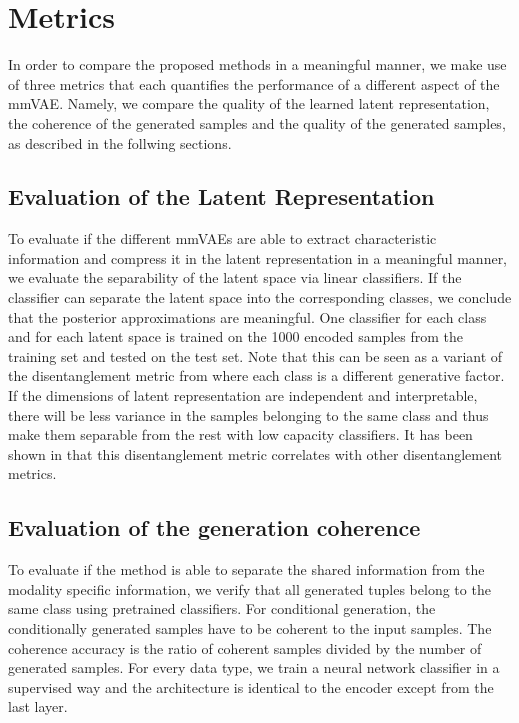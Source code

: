 \section{Metrics}
In order to compare the proposed methods in a meaningful manner, we make use of three metrics that each quantifies the performance of a different aspect of the mmVAE.
Namely, we compare the quality of the learned latent representation, the coherence of the generated samples and the quality of the generated samples, as described in the follwing sections.

\subsection{Evaluation of the Latent Representation}
To evaluate if the different mmVAEs are able to extract characteristic information and compress it in the latent representation in a meaningful manner, we evaluate the separability of the latent space via linear classifiers.
If the classifier can separate the latent space into the corresponding classes, we conclude that the posterior approximations are meaningful.
One classifier for each class and for each latent space is trained on the 1000 encoded samples from the training set and tested on the test set.
Note that this can be seen as a variant of the disentanglement metric from \cite{beta_vae} where each class is a different generative factor.
If the dimensions of latent representation are independent and interpretable, there will be less variance in the samples belonging to the same class and thus make them separable from the rest with low capacity classifiers.
It has been shown in \cite{locatello_challenging_2019} that this disentanglement metric correlates with other disentanglement metrics.

\subsection{Evaluation of the generation coherence}
\label{subsubsec:gen_coh}
To evaluate if the method is able to separate the shared information from the modality specific information, we verify that all generated tuples belong to the same class using pretrained classifiers.
For conditional generation, the conditionally generated samples have to be coherent to the input samples.
The coherence accuracy is the ratio of coherent samples divided by the number of generated samples.
For every data type, we train a neural network classifier in a supervised way and the architecture is identical to the encoder except from the last layer.

